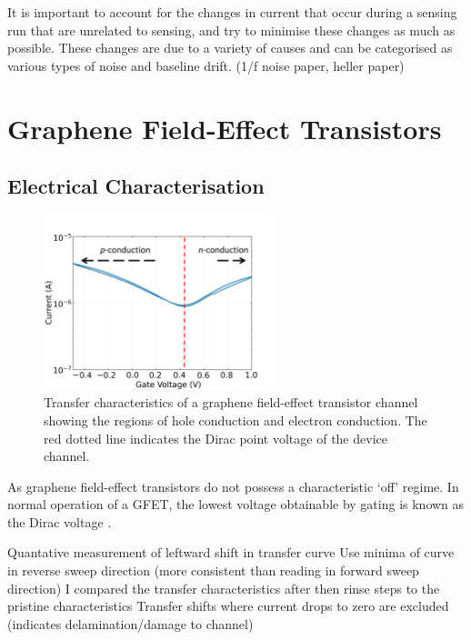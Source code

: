 \documentclass[
  a4paper,
]{scrbook}
\begin{document}
It is important to account for the changes in current that occur during
a sensing run that are unrelated to sensing, and try to minimise these
changes as much as possible. These changes are due to a variety of
causes and can be categorised as various types of noise and baseline
drift. (1/f noise paper, heller paper)

\hypertarget{graphene-field-effect-transistors}{%
\section{Graphene Field-Effect
Transistors}\label{graphene-field-effect-transistors}}

\hypertarget{sec-electrical-characterisation-graphene}{%
\subsection{Electrical
Characterisation}\label{sec-electrical-characterisation-graphene}}

\begin{figure}

{\centering \includegraphics[width=0.6\textwidth,height=\textheight]{figures/ch2/Graphene_transfer.png}

}

\caption{\label{fig-linker-raman}Transfer characteristics of a graphene
field-effect transistor channel showing the regions of hole conduction
and electron conduction. The red dotted line indicates the Dirac point
voltage of the device channel.}

\end{figure}

As graphene field-effect transistors do not possess a characteristic
`off' regime. In normal operation of a GFET, the lowest voltage
obtainable by gating is known as the Dirac voltage
\autocite{Murugathas2020}.

Quantative measurement of leftward shift in transfer curve Use minima of
curve in reverse sweep direction (more consistent than reading in
forward sweep direction) I compared the transfer characteristics after
then rinse steps to the pristine characteristics Transfer shifts where
current drops to zero are excluded (indicates delamination/damage to
channel)
\end{document}
